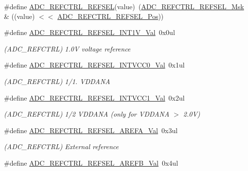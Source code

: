 \begin{DoxyCompactItemize}
\item 
\#define \mbox{\hyperlink{group___s_a_m_d21___a_d_c_gaeaece8ce2ab79ddd6544075a962bd17c}{A\+D\+C\+\_\+\+R\+E\+F\+C\+T\+R\+L\+\_\+\+R\+E\+F\+S\+EL}}(value)~(\mbox{\hyperlink{group___s_a_m_d21___a_d_c_ga097bcd9a6d5327ca7d482630a5cdd106}{A\+D\+C\+\_\+\+R\+E\+F\+C\+T\+R\+L\+\_\+\+R\+E\+F\+S\+E\+L\+\_\+\+Msk}} \& ((value) $<$$<$ \mbox{\hyperlink{group___s_a_m_d21___a_d_c_ga7b8a65054da09cd11886d730594eb8d3}{A\+D\+C\+\_\+\+R\+E\+F\+C\+T\+R\+L\+\_\+\+R\+E\+F\+S\+E\+L\+\_\+\+Pos}}))
\item 
\#define \mbox{\hyperlink{group___s_a_m_d21___a_d_c_gae4da387c4cfcb53398533b4a11cae922}{A\+D\+C\+\_\+\+R\+E\+F\+C\+T\+R\+L\+\_\+\+R\+E\+F\+S\+E\+L\+\_\+\+I\+N\+T1\+V\+\_\+\+Val}}~0x0ul
\begin{DoxyCompactList}\small\item\em (A\+D\+C\+\_\+\+R\+E\+F\+C\+T\+RL) 1.\+0V voltage reference \end{DoxyCompactList}\item 
\#define \mbox{\hyperlink{group___s_a_m_d21___a_d_c_gae5db462246782f67edf39fecc67bf742}{A\+D\+C\+\_\+\+R\+E\+F\+C\+T\+R\+L\+\_\+\+R\+E\+F\+S\+E\+L\+\_\+\+I\+N\+T\+V\+C\+C0\+\_\+\+Val}}~0x1ul
\begin{DoxyCompactList}\small\item\em (A\+D\+C\+\_\+\+R\+E\+F\+C\+T\+RL) 1/1. V\+D\+D\+A\+NA \end{DoxyCompactList}\item 
\#define \mbox{\hyperlink{group___s_a_m_d21___a_d_c_ga82f083020e2747f258e7be98ce53d76c}{A\+D\+C\+\_\+\+R\+E\+F\+C\+T\+R\+L\+\_\+\+R\+E\+F\+S\+E\+L\+\_\+\+I\+N\+T\+V\+C\+C1\+\_\+\+Val}}~0x2ul
\begin{DoxyCompactList}\small\item\em (A\+D\+C\+\_\+\+R\+E\+F\+C\+T\+RL) 1/2 V\+D\+D\+A\+NA (only for V\+D\+D\+A\+NA $>$ 2.\+0V) \end{DoxyCompactList}\item 
\#define \mbox{\hyperlink{group___s_a_m_d21___a_d_c_ga1b593007ede54d3fc5aa91c51eb7d052}{A\+D\+C\+\_\+\+R\+E\+F\+C\+T\+R\+L\+\_\+\+R\+E\+F\+S\+E\+L\+\_\+\+A\+R\+E\+F\+A\+\_\+\+Val}}~0x3ul
\begin{DoxyCompactList}\small\item\em (A\+D\+C\+\_\+\+R\+E\+F\+C\+T\+RL) External reference \end{DoxyCompactList}\item 
\#define \mbox{\hyperlink{group___s_a_m_d21___a_d_c_ga6d43250a0758129bc25bc5c183ae25c3}{A\+D\+C\+\_\+\+R\+E\+F\+C\+T\+R\+L\+\_\+\+R\+E\+F\+S\+E\+L\+\_\+\+A\+R\+E\+F\+B\+\_\+\+Val}}~0x4ul
$$
\end{DoxyCompactItemize}
